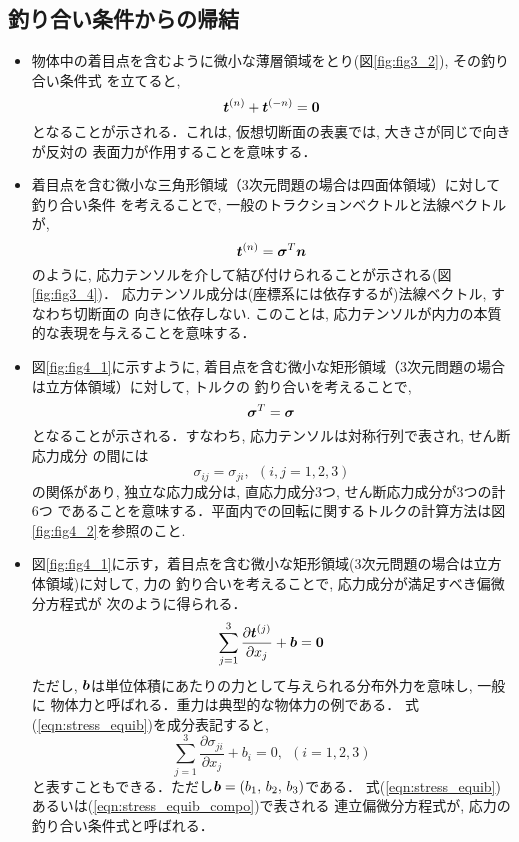 \documentclass[10pt,a4j]{jarticle}
\begin{document}
\subsection{釣り合い条件からの帰結}\label{equib}
\begin{itemize}
\item
	物体中の着目点を含むように微小な薄層領域をとり(図\ref{fig:fig3_2}), その釣り合い条件式
	を立てると, 
	\begin{equation}
		\mbox{\boldmath $t$}^{(n)}+\mbox{\boldmath $t$}^{(-n)}=\mbox{\boldmath $0$}
		\label{eqn:t_pmn}
	\end{equation}
	となることが示される．これは, 仮想切断面の表裏では, 大きさが同じで向きが反対の
	表面力が作用することを意味する．
\item
	着目点を含む微小な三角形領域（3次元問題の場合は四面体領域）に対して釣り合い条件
	を考えることで, 一般のトラクションベクトルと法線ベクトルが, 
	\begin{equation}
		\mbox{\boldmath $t$}^{(n)}=\mbox{\boldmath $\sigma$}^{T}\mbox{\boldmath $n$}
		\label{eqn:t_as_sign}
	\end{equation}
	のように, 応力テンソルを介して結び付けられることが示される(図\ref{fig:fig3_4})．
	応力テンソル成分は(座標系には依存するが)法線ベクトル, すなわち切断面の
	向きに依存しない. このことは, 応力テンソルが内力の本質的な表現を与えることを意味する．
\item
	図\ref{fig:fig4_1}に示すように, 着目点を含む微小な矩形領域（3次元問題の場合は立方体領域）に対して, トルクの
	釣り合いを考えることで, 
	\begin{equation}
		\mbox{\boldmath $\sigma$}^{T}=\mbox{\boldmath $\sigma$}
		\label{eqn:sig_sym}
	\end{equation}
	となることが示される．すなわち, 応力テンソルは対称行列で表され, せん断応力成分
	の間には
	\begin{equation}
		\sigma_{ij}=\sigma_{ji}, \ \ (i,j=1,2,3)
		\label{eqn:sig_sym_comp}
	\end{equation}
	の関係があり, 独立な応力成分は, 直応力成分3つ, せん断応力成分が3つの計6つ
	であることを意味する．平面内での回転に関するトルクの計算方法は図\ref{fig:fig4_2}を参照のこと.
\item
	図\ref{fig:fig4_1}に示す，着目点を含む微小な矩形領域(3次元問題の場合は立方体領域)に対して, 力の
	釣り合いを考えることで, 応力成分が満足すべき偏微分方程式が
	次のように得られる．
	\begin{equation}
		\sum_{j=1}^3 \frac{\partial \mbox{\boldmath $t$}^{(j)}}{\partial x_j}+\mbox{\boldmath $b$}=\mbox{\boldmath $0$}
		\label{eqn:stress_equib}
	\end{equation}
	ただし, $\mbox{\boldmath $b$}$は単位体積にあたりの力として与えられる分布外力を意味し, 一般に
	物体力と呼ばれる．重力は典型的な物体力の例である．
	式(\ref{eqn:stress_equib})を成分表記すると, 
	\begin{equation}
		\sum_{j=1}^3 \frac{\partial \sigma_{ji}}{\partial x_j}+b_i=0, \ \ (i=1,2,3)
		\label{eqn:stress_equib_compo}
	\end{equation}
	と表すこともできる．ただし$\mbox{\boldmath $b$}=(b_1,\,b_2,\, b_3)$である．
	式(\ref{eqn:stress_equib})あるいは(\ref{eqn:stress_equib_compo})で表される
	連立偏微分方程式が, 応力の釣り合い条件式と呼ばれる．
\end{itemize}
\end{document}
